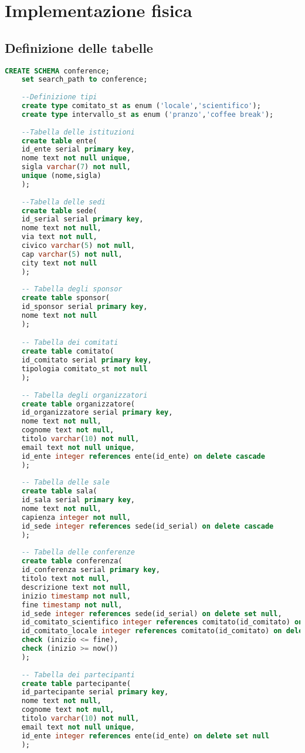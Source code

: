 \section{Implementazione fisica}
\subsection{Definizione delle tabelle}
\begin{lstlisting}[language=SQL, style=mystyle]
	CREATE SCHEMA conference;
	set search_path to conference;
	
	--Definizione tipi
	create type comitato_st as enum ('locale','scientifico');
	create type intervallo_st as enum ('pranzo','coffee break');
	
	--Tabella delle istituzioni
	create table ente(
	id_ente serial primary key,
	nome text not null unique,
	sigla varchar(7) not null,
	unique (nome,sigla)
	);
	
	--Tabella delle sedi
	create table sede(
	id_serial serial primary key,
	nome text not null,
	via text not null,
	civico varchar(5) not null,
	cap varchar(5) not null,
	city text not null
	);
	
	-- Tabella degli sponsor
	create table sponsor(
	id_sponsor serial primary key,
	nome text not null
	);

	-- Tabella dei comitati
	create table comitato(
	id_comitato serial primary key,
	tipologia comitato_st not null
	);
	
	-- Tabella degli organizzatori
	create table organizzatore(
	id_organizzatore serial primary key,
	nome text not null,
	cognome text not null,
	titolo varchar(10) not null,
	email text not null unique,
	id_ente integer references ente(id_ente) on delete cascade
	);
	
	-- Tabella delle sale
	create table sala(
	id_sala serial primary key,
	nome text not null,
	capienza integer not null,
	id_sede integer references sede(id_serial) on delete cascade
	);
	
	-- Tabella delle conferenze
	create table conferenza(
	id_conferenza serial primary key,
	titolo text not null,
	descrizione text not null,
	inizio timestamp not null,
	fine timestamp not null,
	id_sede integer references sede(id_serial) on delete set null,
	id_comitato_scientifico integer references comitato(id_comitato) on delete set null,
	id_comitato_locale integer references comitato(id_comitato) on delete set null,
	check (inizio <= fine),
	check (inizio >= now())
	);
	
	-- Tabella dei partecipanti
	create table partecipante(
	id_partecipante serial primary key,
	nome text not null,
	cognome text not null,
	titolo varchar(10) not null,
	email text not null unique,
	id_ente integer references ente(id_ente) on delete set null
	);
	

\end{lstlisting}
